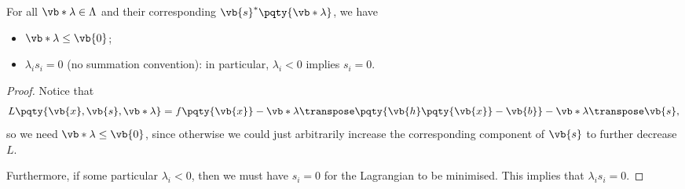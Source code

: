 \begin{proposition}
    For all \(\vb*{\lambda} \in \Lambda\) and their corresponding \(\vb{s}^{\ast} \pqty{\vb*{\lambda}}\), we have
    \begin{itemize}
        \item \(\vb*{\lambda} \leq \vb{0}\);
        \item \(\lambda_i s_i = 0\) (no summation convention): in particular, \(\lambda_i < 0\) implies \(s_i = 0\).
    \end{itemize}
\end{proposition}

\begin{proof}
    Notice that
    \[
        L\pqty{\vb{x}, \vb{s}, \vb*{\lambda}} = f\pqty{\vb{x}} - \vb*{\lambda} \transpose \pqty{\vb{h}\pqty{\vb{x}} - \vb{b}} - \vb*{\lambda}\transpose \vb{s},
    \]
    so we need \(\vb*{\lambda} \leq \vb{0}\), since otherwise we could just arbitrarily increase the corresponding component of \(\vb{s}\) to further decrease \(L\).

    Furthermore, if some particular \(\lambda_i < 0\), then we must have \(s_i = 0\) for the Lagrangian to be minimised. This implies that \(\lambda_i s_i = 0\).
\end{proof}

